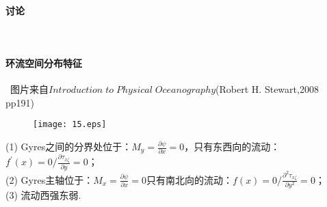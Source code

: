 \documentclass[a4paper,12pt]{article}
\begin{document}
    \paragraph{讨论}~{}
    \paragraph{环流空间分布特征}~{\centering 图片来自$Introduction \;to \; Physical \;Oceanography$(Robert H. Stewart,2008 pp191)}
    \begin{figure}[H]
        \centering\texttt{[image: 15.eps]}
        \caption*{}
    \end{figure}
    (1) Gyres之间的分界处位于：$\displaystyle M_y=\frac{\partial \psi}{\partial x}=0$，只有东西向的流动：$\displaystyle f^{\prime}(x)=0/\frac{\partial \tau_{x\zeta}}{\partial y}=0$；\\
    (2) Gyres主轴位于：$\displaystyle M_x=\frac{\partial \psi}{\partial x}=0$只有南北向的流动：$\displaystyle f(x)=0/\frac{\partial^2 \tau_{x\zeta}}{\partial y^2}=0$；\\
    (3) 流动西强东弱.
\end{document}
